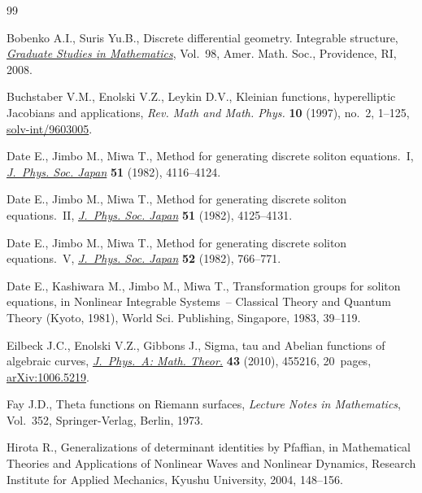 \documentclass[pdftex]{sigma}
\begin{document}
\begin{thebibliography}{99}
\footnotesize\itemsep=0pt

Bobenko A.I., Suris Yu.B., Discrete dif\/ferential geometry. Integrable structure,
  \href{http://dx.doi.org/10.1007/978-3-7643-8621-4}{\textit{Graduate Studies in Mathematics}}, Vol.~98, Amer. Math. Soc.,
  Providence, RI, 2008.

Buchstaber V.M., Enolski V.Z., Leykin D.V., Kleinian functions, hyperelliptic
  Jacobians and applications, \textit{Rev. Math and Math. Phys.} \textbf{10}
  (1997), no.~2, 1--125, \href{http://arxiv.org/abs/solv-int/9603005}{solv-int/9603005}.

Date E., Jimbo M., Miwa T., Method for generating discrete soliton
  equations.~{I}, \href{http://dx.doi.org/10.1143/JPSJ.51.4116}{\textit{J.~Phys. Soc. Japan}} \textbf{51} (1982), 4116--4124.

Date E., Jimbo M., Miwa T., Method for generating discrete soliton
  equations.~{II}, \href{http://dx.doi.org/10.1143/JPSJ.51.4125}{\textit{J.~Phys. Soc. Japan}} \textbf{51} (1982), 4125--4131.

Date E., Jimbo M., Miwa T., Method for generating discrete soliton
  equations.~{V}, \href{http://dx.doi.org/10.1143/JPSJ.52.766}{\textit{J.~Phys. Soc. Japan}} \textbf{52} (1982), 766--771.

Date E., Kashiwara M., Jimbo M., Miwa T., Transformation groups for soliton
  equations, in Nonlinear In\-tegrable Systems~-- Classical Theory and Quantum
  Theory ({K}yoto, 1981), World Sci. Publishing, Singapore, 1983, 39--119.

Eilbeck J.C., Enolski V.Z., Gibbons J., Sigma, tau and {A}belian functions of
  algebraic curves, \href{http://dx.doi.org/10.1088/1751-8113/43/45/455216}{\textit{J.~Phys.~A: Math. Theor.}} \textbf{43} (2010),
  455216, 20~pages, \href{http://arxiv.org/abs/1006.5219}{arXiv:1006.5219}.

Fay J.D., Theta functions on {R}iemann surfaces, \textit{Lecture Notes in
  Mathematics}, Vol.~352, Springer-Verlag, Berlin, 1973.

Hirota R., Generalizations of determinant identities by Pfaf\/f\/ian, in
  Mathematical Theories and Applications of Nonlinear Waves and Nonlinear
  Dynamics, Research Institute for Applied Mechanics, Kyushu University, 2004, 148--156.


\end{thebibliography}
\end{document}
